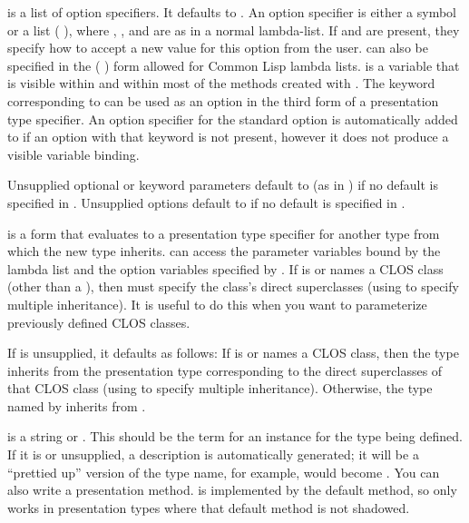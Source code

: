  is a list of option specifiers.  It defaults to .  An
option specifier is either a symbol or a list ( \optional
{}   ),
where , , and  are as in a normal
lambda-list.  If  and  are present,
they specify how to accept a new value for this option from the user.
 can also be specified in the ( ) form
allowed for Common Lisp lambda lists.   is a variable that is
visible within  and within most of the methods created with
.  The keyword corresponding to  can
be used as an option in the third form of a presentation type specifier.  An
option specifier for the standard option  is automatically
added to  if an option with that keyword is not present, however it
does not produce a visible variable binding.

Unsupplied optional or keyword parameters default to \cl{*} (as in )
if no default is specified in .  Unsupplied options default to
 if no default is specified in .

 is a form that evaluates to a presentation type specifier for
another type from which the new type inherits.   can access
the parameter variables bound by the  lambda list and the option
variables specified by .  If  is or names a CLOS class
(other than a ), then  must specify the
class's direct superclasses (using  to specify multiple inheritance).
It is useful to do this when you want to parameterize previously defined CLOS
classes.

If  is unsupplied, it defaults as follows:  If  is
or names a CLOS class, then the type inherits from the presentation type
corresponding to the direct superclasses of that CLOS class (using  to
specify multiple inheritance).  Otherwise, the type named by  inherits
from .

 is a string or .  This should be the term for an
instance for the type being defined.  If it is  or unsupplied, a
description is automatically generated; it will be a ``prettied up'' version of
the type name, for example,  would become .  You can also write a  presentation
method.   is implemented by the default
 method, so  only works in
presentation types where that default method is not shadowed.

